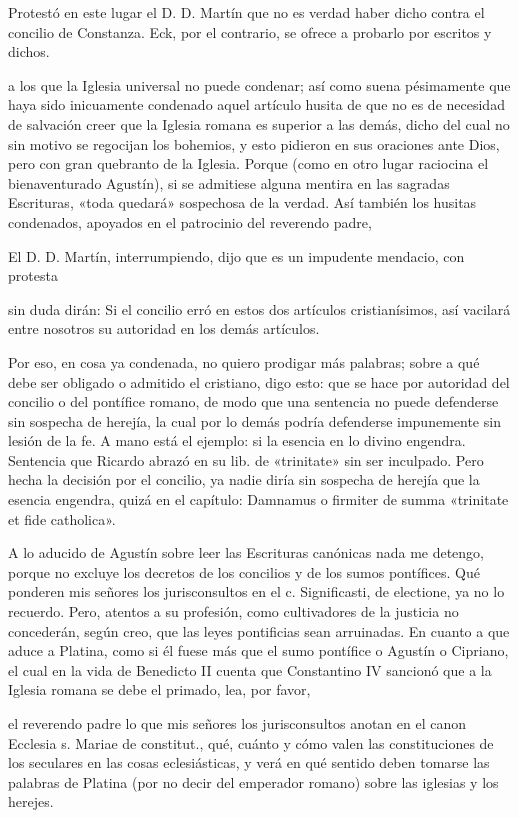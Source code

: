 Protestó en este lugar el D. D. Martín que no es verdad haber dicho contra el concilio de Constanza. Eck, por el contrario, se ofrece a probarlo por escritos y dichos.

a los que la Iglesia universal no puede condenar; así como suena pésimamente que haya sido inicuamente condenado aquel artículo husita de que no es de necesidad de salvación creer que la Iglesia romana es superior a las demás, dicho del cual no sin motivo se regocijan los bohemios, y esto pidieron en sus oraciones ante Dios, pero con gran quebranto de la Iglesia. Porque (como en otro lugar raciocina el bienaventurado Agustín), si se admitiese alguna mentira en las sagradas Escrituras, «toda quedará» sospechosa de la verdad. Así también los husitas condenados, apoyados en el patrocinio del reverendo padre,

El D. D. Martín, interrumpiendo, dijo que es un impudente mendacio, con protesta

sin duda \marginpar{\small[284]} dirán: Si el concilio erró en estos dos artículos cristianísimos, así vacilará entre nosotros su autoridad en los demás artículos.

Por eso, en cosa ya condenada, no quiero prodigar más palabras; sobre a qué debe ser obligado o admitido el cristiano, digo esto: que se hace por autoridad del concilio o del pontífice romano, de modo que una sentencia no puede defenderse sin sospecha de herejía, la cual por lo demás podría defenderse impunemente sin lesión de la fe. A mano está el ejemplo: si la esencia en lo divino engendra. Sentencia que Ricardo abrazó en su lib. de «trinitate» sin ser inculpado. Pero hecha la decisión por el concilio, ya nadie diría sin sospecha de herejía que la esencia engendra, quizá en el capítulo: Damnamus o firmiter de summa «trinitate et fide catholica».

A lo aducido de Agustín sobre leer las Escrituras canónicas nada me detengo, porque no excluye los decretos de los concilios y de los sumos pontífices. Qué ponderen mis señores los jurisconsultos en el c. Significasti, de electione, ya no lo recuerdo. Pero, atentos a su profesión, como cultivadores de la justicia no concederán, según creo, que las leyes pontificias sean arruinadas. En cuanto a que aduce a Platina, como si él fuese más que el sumo pontífice o Agustín o Cipriano, el cual en la vida de Benedicto II cuenta que Constantino IV sancionó que a la Iglesia romana se debe el primado, lea, por favor,

el reverendo padre lo que mis señores los jurisconsultos anotan en el canon Ecclesia s. Mariae de constitut., qué, cuánto y cómo valen las constituciones de los seculares en las cosas eclesiásticas, y verá en qué sentido deben tomarse las palabras de Platina (por no decir del emperador romano) sobre las iglesias y los herejes.

